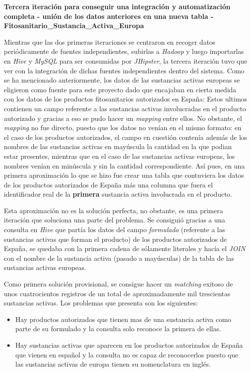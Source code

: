 \par 
\textbf{Tercera iteración para conseguir una integración y automatización completa - unión de los datos anteriores en una nueva tabla - Fitosanitario\_Sustancia\_Activa\_Europa}
\bigskip
\par 
Mientras que las dos primeras iteraciones se centraron en recoger datos periódicamente de fuentes independientes, subirlas a \textit{Hadoop} y luego importarlas en \textit{Hive} y \textit{MySQL} para ser consumidas por \textit{JHipster}, la tercera iteración tuvo que ver con la integración de dichas fuentes independientes dentro del sistema. Como se ha mencionado anteriormente, los datos de las sustancias activas europeas se eligieron como fuente para este proyecto dado que encajaban en cierta medida con los datos de los productos fitosanitarios autorizados en España:  Estos ultimos contienen un campo referente a las sustancias activas involucradas en el producto autorizado y gracias a eso se pudo hacer un \textit{mapping} entre ellos. No obstante, el \textit{mapping} no fue directo, puesto que los datos no venían en el mismo formato: en el caso de los productos autorizados, el campo en cuestión contenía además de los nombres de las sustancias activas en mayúscula la cantidad en la que podian estar presentes, mientras que en el caso de las sustancias activas europeas, los nombres venían en minúscula y sin la cantidad correspondiente. Así pues, en una primera aproximación lo que se hizo fue crear una tabla que contuviera los datos de los productos autorizados de España más una columna que fuera el identificador real de la \textbf{primera} sustancia activa involucrada en el producto. \par Esta aproximación no es la solución perfecta, no obstante, es una primera iteración que soluciona una parte del problema. Se consiguió gracias a una consulta en \textit{Hive} que partía los datos del campo \textit{formulado} (referente a las sustancias activas que forman el producto) de los productos autorizados de España, se quedaba con la primera cadena de sólamente literales y hacía el \textit{JOIN} con el nombre de la sustancia activa (pasado a mayúsculas) de la tabla de las sustancias activas europeas. 
\par Como primera solución provisional, se consigue hacer un \textit{matching} exitoso de unos cuatrocientos registros de un total de aproximadamente mil trescientas sustancias activas. Los problemas que presenta son los siguientes: 


\begin{itemize}
\item Hay productos autorizados que tienen mas de una sustancia activa como parte de su formulado y la consulta solo reconoce la primera de ellas.
\item Hay sustancias activas que aparecen en los productos autorizados de España que vienen en español y la consulta no es capaz de reconocerlos puesto que las sustancias activas de europa tienen su nomenclatura en inglés.
\end{itemize}


